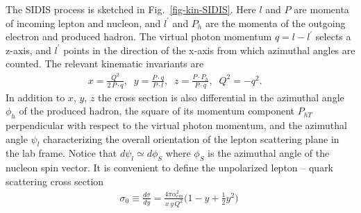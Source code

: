 \documentclass[a4paper,11pt]{article}
\newcommand{\ba}{\begin{eqnarray}}
\newcommand{\ea}{\end{eqnarray}}
\def\Phperp{P_{hT}}
\begin{document}
The SIDIS process is sketched in 
Fig.~\ref{fig-kin-SIDIS}. Here $l$ and $P$ are momenta of incoming 
lepton and nucleon, and $l^\prime$ and $P_h$ are the momenta of the outgoing
electron and produced hadron. The virtual photon momentum $q=l-l^\prime$ 
selects a z-axis, and $l^\prime$ points in the direction of the x-axis 
from which azimuthal angles are counted. The relevant kinematic invariants 
are
\ba
   x  = \frac{Q^2}{2\,P\cdot  q}, \;\;
   y = \frac{P \cdot  q}{P \cdot  l}, \;\;
   z = \frac{P \cdot  P_h}{P\cdot  q}, \;\;
   Q^2=-q^2.
\label{eq:xyz}\;\;\;\;\ea
In addition to $x$, $y$, $z$ the cross section is also differential 
in the azimuthal angle $\phi_h$ of the produced hadron, the square 
of its momentum component $\Phperp$ perpendicular with respect to the 
virtual photon momentum, and the azimuthal angle $\psi_l$ characterizing 
the overall orientation of the lepton scattering plane in the lab frame.
Notice that $d \psi_l \simeq d\phi_S$ where $\phi_S$ is the azimuthal angle
of the nucleon spin vector. It is convenient to define the unpolarized
lepton -- quark scattering cross section
\ba\label{Eq:sigma0-FUU}
	\sigma_0 \equiv \frac{d \sigma}{dy} 
	= 
	\frac{4 \pi \alpha_{em}^2}{x\,y\,Q^2}
	\biggl(1-y+\frac12y^2\biggr)\;
\ea
\end{document}
